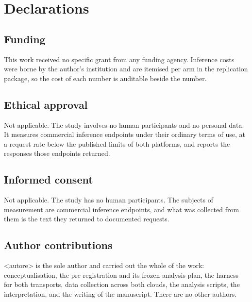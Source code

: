 \section*{Declarations}

\subsection*{Funding}

This work received no specific grant from any funding agency. Inference costs were borne by the
author's institution and are itemised per arm in the replication package, so the cost of each
number is auditable beside the number.

\subsection*{Ethical approval}

Not applicable. The study involves no human participants and no personal data. It measures
commercial inference endpoints under their ordinary terms of use, at a request rate below the
published limits of both platforms, and reports the responses those endpoints returned.

\subsection*{Informed consent}

Not applicable. The study has no human participants. The subjects of measurement are commercial inference
endpoints, and what was collected from them is the text they returned to documented requests.

\subsection*{Author contributions}

<autore> is the sole author and carried out the whole of the work: conceptualisation,
the pre-registration and its frozen analysis plan, the harness for both transports, data
collection across both clouds, the analysis scripts, the interpretation, and the writing of the
manuscript. There are no other authors.

